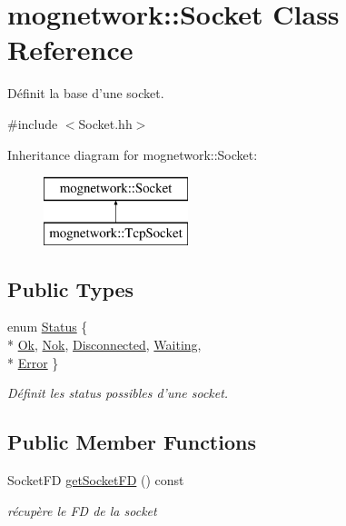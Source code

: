 \hypertarget{classmognetwork_1_1_socket}{\section{mognetwork\-:\-:Socket Class Reference}
\label{classmognetwork_1_1_socket}
}


Définit la base d'une socket.  




{\ttfamily \#include $<$Socket.\-hh$>$}

Inheritance diagram for mognetwork\-:\-:Socket\-:\begin{figure}[H]
\begin{center}
\leavevmode
\includegraphics[height=2.000000cm]{classmognetwork_1_1_socket}
\end{center}
\end{figure}
\subsection*{Public Types}
\begin{DoxyCompactItemize}
\item 
enum \hyperlink{classmognetwork_1_1_socket_aa187a8394ac0d6203af0ec7f021ca15f}{Status} \{ \\*
\hyperlink{classmognetwork_1_1_socket_aa187a8394ac0d6203af0ec7f021ca15fa1a76bb652d4c1fdb64829e97b7062a7b}{Ok}, 
\hyperlink{classmognetwork_1_1_socket_aa187a8394ac0d6203af0ec7f021ca15fa088ded708dfc87053ea73283b18929b5}{Nok}, 
\hyperlink{classmognetwork_1_1_socket_aa187a8394ac0d6203af0ec7f021ca15fa76cee46670ca9c26209aaf48ba12a6ea}{Disconnected}, 
\hyperlink{classmognetwork_1_1_socket_aa187a8394ac0d6203af0ec7f021ca15fa73f0c13cec39a68a4896b33c916d551c}{Waiting}, 
\\*
\hyperlink{classmognetwork_1_1_socket_aa187a8394ac0d6203af0ec7f021ca15fae82858abe36f6f41dde52bea32212238}{Error}
 \}
\begin{DoxyCompactList}\small\item\em Définit les status possibles d'une socket. \end{DoxyCompactList}\end{DoxyCompactItemize}
\subsection*{Public Member Functions}
\begin{DoxyCompactItemize}
\item 
Socket\-F\-D \hyperlink{classmognetwork_1_1_socket_a6fc34e842d4efbd526697a12e826806a}{get\-Socket\-F\-D} () const 
\begin{DoxyCompactList}\small\item\em récupère le F\-D de la socket \end{DoxyCompactList}\end{DoxyCompactItemize}
